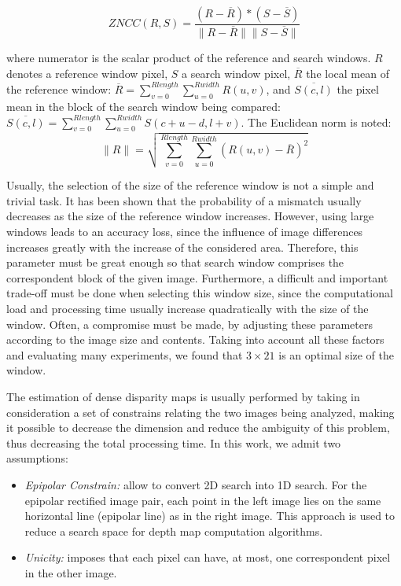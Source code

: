 \documentclass[conference]{IEEEtran}
\begin{document}
\begin{equation}\label{eq:zncc}
ZNCC(R,S)=\frac{\left(R-\overline{R}\right) * \left(S-\overline{S}\right)}{\|R-\overline{R}\| \|S-\overline{S}\|}
\end{equation}

where numerator is the scalar product of the reference and search windows. $R$ denotes a reference window pixel, $S$ a search window pixel, $\overline{R}$ the local mean of the reference window: $\overline{R}=\sum_{v=0}^{Rlength}\sum_{u=0}^{Rwidth}R\left(u,v\right)$, and $\overline{S\left(c,l\right)}$ the pixel mean in the block of the search window being compared: $\overline{S\left(c,l\right)}=\sum_{v=0}^{Rlength}\sum_{u=0}^{Rwidth}S\left(c+u-d,l+v\right)$. The Euclidean norm is noted:
\begin{equation}
\|R\| = \sqrt{\sum_{v=0}^{Rlength}\sum_{u=0}^{Rwidth}\left(R\left(u,v\right) - \overline{R}\right)^2}
\end{equation}

Usually, the selection of the size of the reference window is not a simple and trivial task. It has been shown that the probability of a mismatch usually decreases as the size of the reference window increases. However, using large windows leads to an accuracy loss, since the influence of image differences increases greatly with the increase of the considered area. Therefore, this parameter must be great enough so that search window comprises the correspondent block of the given image. Furthermore, a difficult and important trade-off must be done when selecting this window size, since the computational load and processing time usually increase quadratically with the size of the window. Often, a compromise must be made, by adjusting these parameters according to the image size and contents. Taking into account all these factors and evaluating many experiments, we found that $3 \times 21$ is an optimal size of the window.

The estimation of dense disparity maps is usually performed by taking in consideration a set of constrains relating the two images being analyzed, making it possible to decrease the dimension and reduce the ambiguity of this problem, thus decreasing the total processing time. In this work, we admit two assumptions:
\begin{itemize}
	\item \textit{Epipolar Constrain:} allow to convert 2D search into 1D search. For the epipolar rectified image pair, each point in the left image lies on the same horizontal line (epipolar line) as in the right image. This approach is used to reduce a search space for depth map computation algorithms.
	\item \textit{Unicity:} imposes that each pixel can have, at most, one correspondent pixel in the other image.
\end{itemize}
\end{document}
